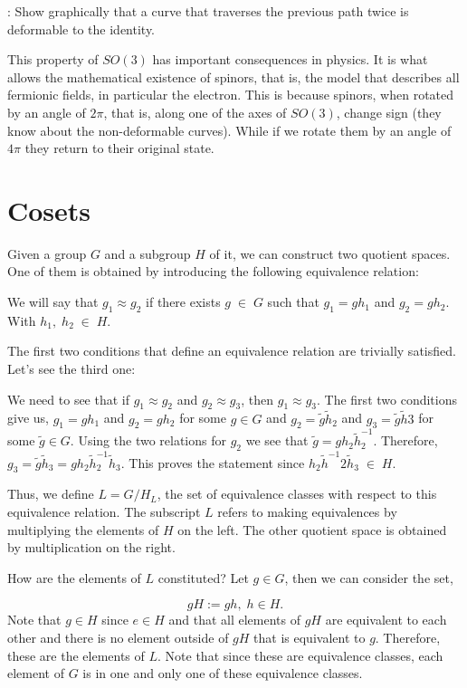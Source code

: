 \ejer: Show graphically that a curve that traverses the previous path twice is deformable to the identity.

This property of $SO(3)$ has important consequences in physics. It is what allows the mathematical existence of spinors, that is, the model that describes all fermionic fields, in particular the electron. This is because spinors, when rotated by an angle of $2\pi$, that is, along one of the axes of $SO(3)$, change sign (they know about the non-deformable curves). While if we rotate them by an angle of $4\pi$ they return to their original state.


\section{Cosets}

Given a group $G$ and a subgroup $H$ of it, we can construct two quotient spaces.
One of them is obtained by introducing the following equivalence relation:

We will say that $g_{1} \approx g_{2}$ if there exists $g \; \in \; G$ such that 
$g_{1}=g h_{1}$ and $g_{2}=g h_{2}$.
With $h_{1}, \; h_{2}\; \in \; H$.

The first two conditions that define an equivalence relation are trivially satisfied. 
Let's see the third one:

We need to see that if $g_{1} \approx g_{2}$ and $g_{2} \approx g_{3}$, then $g_{1}\approx g_{3}$. 
The first two conditions give us, $g_{1}=g h_{1}$ and $g_{2}=g h_{2}$ for some $g \in G$ and 
$g_{2}=\tilde{g} \tilde{h}_{2}$ and $g_{3}=\tilde{g} \tilde{h}{3}$ for some $\tilde{g} \in G$. 
Using the two relations for $g_{2}$ we see that $\tilde{g} = g h_{2} \tilde{h}^{-1}_{2}$. 
Therefore, $g_{3}=\tilde{g} \tilde{h}_{3} = g h_{2} \tilde{h}^{-1}_{2}\tilde{h}_{3}$. 
This proves the statement since $h_{2} \tilde{h}^{-1}{2}\tilde{h}_{3} \;\in \; H$.

Thus, we define $L=G/H_{L}$, the set of equivalence classes with respect to this equivalence relation. 
The subscript $L$ refers to making equivalences by multiplying the elements of $H$ on the left. 
The other quotient space is obtained by multiplication on the right.

How are the elements of $L$ constituted? Let $g\in G$, then we can consider the set,

\[ 
gH := { gh, \; h \in H}. 
\] 
% 
Note that $g \in H$ since $e \in H$ and that all elements of $gH$ are equivalent to each other and there is no element outside of $gH$ that is equivalent to $g$. 
Therefore, these are the elements of $L$. 
Note that since these are equivalence classes, each element of $G$ is in one and only one of these equivalence classes.

